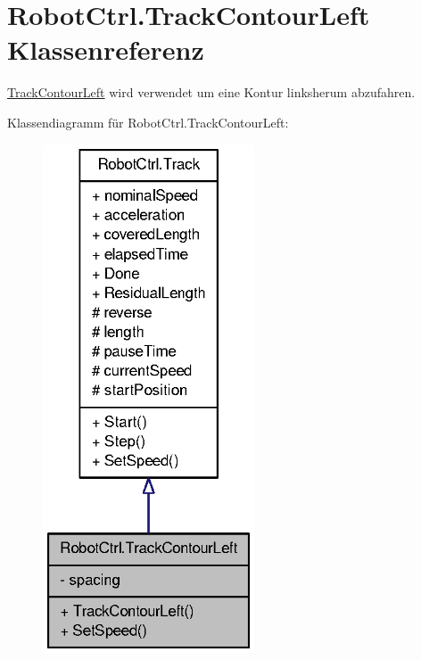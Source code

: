 \hypertarget{class_robot_ctrl_1_1_track_contour_left}{
\section{RobotCtrl.TrackContourLeft Klassenreferenz}
\label{class_robot_ctrl_1_1_track_contour_left}
}


\hyperlink{class_robot_ctrl_1_1_track_contour_left}{TrackContourLeft} wird verwendet um eine Kontur linksherum abzufahren.  




Klassendiagramm für RobotCtrl.TrackContourLeft:\nopagebreak
\begin{figure}[H]
\begin{center}
\leavevmode
\includegraphics[width=178pt]{class_robot_ctrl_1_1_track_contour_left__inherit__graph}
\end{center}
\end{figure}


